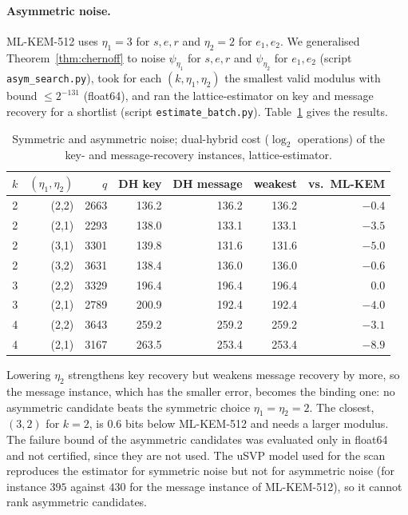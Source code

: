 \documentclass[11pt]{article}
\theoremstyle{remark}
\begin{document}
\paragraph{Asymmetric noise.} ML-KEM-512 uses $\eta_1=3$ for $s,e,r$ and $\eta_2=2$ for $e_1,e_2$. We generalised Theorem~\ref{thm:chernoff} to noise $\psi_{\eta_1}$ for $s,e,r$ and $\psi_{\eta_2}$ for $e_1,e_2$ (script \texttt{asym\_search.py}), took for each $(k,\eta_1,\eta_2)$ the smallest valid modulus with bound $\le2^{-131}$ (float64), and ran the lattice-estimator on key and message recovery for a shortlist (script \texttt{estimate\_batch.py}). Table~\ref{tab:asym} gives the results.
\begin{table}[h]\centering\small
\begin{tabular}{rrrrrrr}\toprule
$k$ & $(\eta_1,\eta_2)$ & $q$ & DH key & DH message & weakest & vs.\ ML-KEM\\\midrule
2 & (2,2) & 2663 & 136.2 & 136.2 & 136.2 & $-0.4$\\
2 & (2,1) & 2293 & 138.0 & 133.1 & 133.1 & $-3.5$\\
2 & (3,1) & 3301 & 139.8 & 131.6 & 131.6 & $-5.0$\\
2 & (3,2) & 3631 & 138.4 & 136.0 & 136.0 & $-0.6$\\\midrule
3 & (2,2) & 3329 & 196.4 & 196.4 & 196.4 & $0.0$\\
3 & (2,1) & 2789 & 200.9 & 192.4 & 192.4 & $-4.0$\\\midrule
4 & (2,2) & 3643 & 259.2 & 259.2 & 259.2 & $-3.1$\\
4 & (2,1) & 3167 & 263.5 & 253.4 & 253.4 & $-8.9$\\\bottomrule
\end{tabular}
\caption{Symmetric and asymmetric noise; dual-hybrid cost ($\log_2$ operations) of the key- and message-recovery instances, lattice-estimator.}\label{tab:asym}
\end{table}
Lowering $\eta_2$ strengthens key recovery but weakens message recovery by more, so the message instance, which has the smaller error, becomes the binding one: no asymmetric candidate beats the symmetric choice $\eta_1=\eta_2=2$. The closest, $(3,2)$ for $k=2$, is $0.6$ bits below ML-KEM-512 and needs a larger modulus. The failure bound of the asymmetric candidates was evaluated only in float64 and not certified, since they are not used. The uSVP model used for the scan reproduces the estimator for symmetric noise but not for asymmetric noise (for instance $395$ against $430$ for the message instance of ML-KEM-512), so it cannot rank asymmetric candidates.
\end{document}
